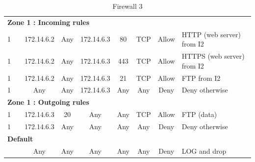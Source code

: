\documentclass[a4paper,titlepage]{article}
\begin{document}
\begin{landscape}
\begin{table}[h]
\begin{tabular}{c|c|cc|cc|ccl}
			\hline
			\multicolumn{9}{l}{\textbf{Zone 1 : Incoming rules}}\\
			1 &  & 172.14.6.2  & Any & 172.14.6.3 & 80 & TCP & Allow & HTTP (web server) from I2\\
			1 &  & 172.14.6.2  & Any & 172.14.6.3 & 443 & TCP & Allow & HTTPS (web server) from I2\\
			1 &  & 172.14.6.2 & Any & 172.14.6.3 & 21 & TCP & Allow & FTP from I2\\
			1 &  & Any & Any & 172.14.6.3 & Any & Any & Deny & Deny otherwise\\

			\hline
			\multicolumn{9}{l}{\textbf{Zone 1 : Outgoing rules}}\\
			1 &  & 172.14.6.3 & 20 & Any & Any & TCP & Allow & FTP (data)\\
			1 &  & 172.14.6.3 & Any & Any & Any & Any & Deny & Deny otherwise\\
			\multicolumn{9}{l}{\textbf{Default}}\\
			 &  & Any & Any & Any & Any & Any & Deny & LOG and drop\\
		\end{tabular}
		\caption{Firewall 3}
	\end{table}
	\vspace*{\fill}
\end{landscape}



\end{document}
